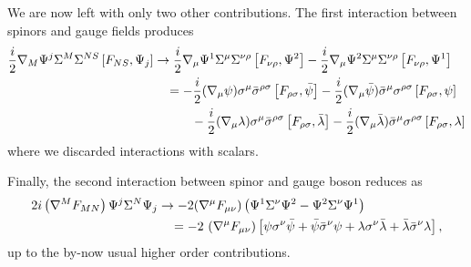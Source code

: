 We are now left with only two other contributions.
The first interaction between spinors and gauge fields produces
\begin{equation}\label{dim-red-covDpsisigmasigaFpsi}
\begin{split}
\frac{i}{2} { \mathcal{\nabla} }_M \Psi^j \Sigma^M \Sigma^{NS} 
\left[ F_{NS} , \Psi_j \right]
	& \rightarrow 
	\frac{i}{2} { \mathcal{\nabla} }_\mu \Psi^1 \Sigma^\mu \Sigma^{\nu\rho} 
	\left[ F_{ \nu \rho } , \Psi^2 \right]
	- \frac{i}{2} { \mathcal{\nabla} }_\mu \Psi^2 \Sigma^\mu \Sigma^{\nu\rho} 
		\left[ F_{ \nu \rho } , \Psi^1 \right]
\\
& \quad
		=
		- \frac{i}{2} 
			({ \mathcal{\nabla} }_\mu \psi) \sigma^\mu \bar \sigma^{\rho \sigma}
			\left[ F_{ \rho \sigma } , 	 \bar \psi \right]
		- \frac{i}{2}
			({ \mathcal{\nabla} }_\mu \bar \psi) \bar \sigma^\mu \sigma^{\rho \sigma}
			\left[ F_{ \rho \sigma } ,  \psi \right]
\\
& \qquad \quad
		- \frac{i}{2} 
			({ \mathcal{\nabla} }_\mu \lambda) \sigma^\mu \bar \sigma^{\rho \sigma}
			\left[ F_{ \rho \sigma } , 	 \bar \lambda \right]
		- \frac{i}{2}
			({ \mathcal{\nabla} }_\mu \bar \lambda) \bar \sigma^\mu \sigma^{\rho \sigma}
			\left[ F_{ \rho \sigma } ,  \lambda \right]
\end{split}
\end{equation}
where we discarded interactions with scalars.

Finally, the second interaction between spinor and gauge boson reduces as
\begin{equation}\label{dim-red-covDFpsisigmapsi}
\begin{split}
2 i \left( \covD^M F_{MN} \right) \Psi^j \Sigma^N \Psi_j
	& \rightarrow 
		- 2 ( \covD^\mu F_{ \mu \nu } )
			\left(
				 \Psi^1 \Sigma^\nu \Psi^2
				 -
				 \Psi^2 \Sigma^\nu \Psi^1
			\right)
\\
	& \quad
		 = 
		- 2\ ( \covD^\mu F_{ \mu \nu } ) %
			\left[
			 \psi \sigma^\nu \bar \psi 
				+ \bar \psi \bar \sigma^\nu \psi 
				+ \lambda \sigma^\nu \bar \lambda 
				+ \bar \lambda \bar \sigma^\nu \lambda 				
				\right],
\end{split}
\end{equation}
up to the by-now usual higher order contributions.




